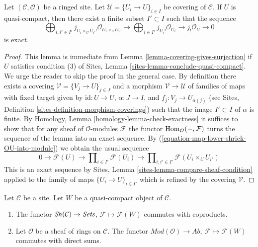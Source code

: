 \begin{lemma}
\label{lemma-silly-quasi-compact}
Let $(\mathcal{C}, \mathcal{O})$ be a ringed site. Let
$\mathcal{U} = \{U_i \to U\}_{i \in I}$ be covering of $\mathcal{C}$.
If $U$ is quasi-compact, then there exist a finite subset
$I' \subset I$ such that the sequence
$$
\bigoplus\nolimits_{i, i' \in I'}
j_{U_i \times_U U_{i'}!}\mathcal{O}_{U_i \times_U U_{i'}} \to
\bigoplus\nolimits_{i \in I'}
j_{U_i!}\mathcal{O}_{U_i} \to
j_!\mathcal{O}_U \to 0
$$
is exact.
\end{lemma}

\begin{proof}
This lemma is immediate from Lemma \ref{lemma-covering-gives-surjection}
if $U$ satisfies condition (3) of
Sites, Lemma \ref{sites-lemma-conclude-quasi-compact}.
We urge the reader to skip the proof in the general case.
By definition there exists a covering
$\mathcal{V} = \{V_j \to U\}_{j \in J}$ and a morphism
$\mathcal{V} \to \mathcal{U}$ of families of maps with fixed target
given by $\text{id} : U \to U$, $\alpha : J \to I$, and
$f_j : V_j \to U_{\alpha(j)}$
(see Sites, Definition \ref{sites-definition-morphism-coverings})
such that the image $I' \subset I$ of $\alpha$ is finite.
By Homology, Lemma \ref{homology-lemma-check-exactness}
it suffices to show that for any sheaf of $\mathcal{O}$-modules $\mathcal{F}$
the functor $\mathop{\mathrm{Hom}}\nolimits_\mathcal{O}(-, \mathcal{F})$ turns the sequence
of the lemma into an exact sequence. By
(\ref{equation-map-lower-shriek-OU-into-module})
we obtain the usual sequence
$$
0 \to
\mathcal{F}(U) \to
\prod\nolimits_{i \in I'} \mathcal{F}(U_i) \to
\prod\nolimits_{i, i' \in I'} \mathcal{F}(U_i \times_U U_{i'})
$$
This is an exact sequence by
Sites, Lemma \ref{sites-lemma-compare-sheaf-condition}
applied to the family of maps $\{U_i \to U\}_{i \in I'}$
which is refined by the covering $\mathcal{V}$.
\end{proof}

\begin{lemma}
\label{lemma-sections-over-quasi-compact}
Let $\mathcal{C}$ be a site. Let $W$ be a quasi-compact
object of $\mathcal{C}$.
\begin{enumerate}
\item The functor $\mathop{\mathit{Sh}}\nolimits(\mathcal{C}) \to \textit{Sets}$,
$\mathcal{F} \mapsto \mathcal{F}(W)$ commutes with coproducts.
\item Let $\mathcal{O}$ be a sheaf of rings on $\mathcal{C}$. The functor
$\textit{Mod}(\mathcal{O}) \to \textit{Ab}$,
$\mathcal{F} \mapsto \mathcal{F}(W)$
commutes with direct sums.
\end{enumerate}
\end{lemma}

